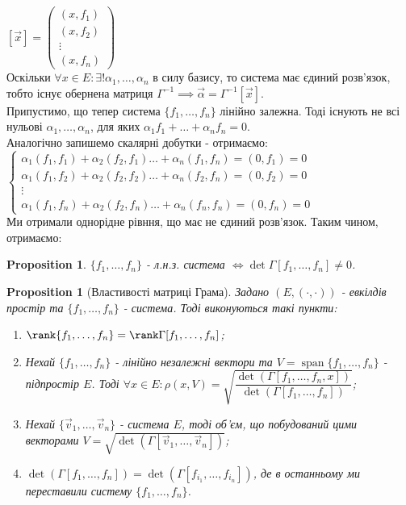 \documentclass[a4paper, 10pt]{article}
\theoremstyle{theoremdd}
\newtheorem{proposition}[theorem]{Proposition}
\DeclareMathOperator{\linspan}{span}
\begin{document}
$[\vec{x}] = \begin{pmatrix}
(x,f_1) \\ (x,f_2) \\ \vdots \\ (x,f_n)
\end{pmatrix}$\\
Оскільки $\forall x \in E: \exists! \alpha_1,\dots,\alpha_n$ в силу базису, то система має єдиний розв'язок, тобто існує обернена матриця $\Gamma^{-1} \implies \vec{\alpha} = \Gamma^{-1} [\vec{x}]$.
\bigskip \\
Припустимо, що тепер система $\{f_1,\dots,f_n\}$ лінійно залежна. Тоді існують не всі нульові $\alpha_1,\dots,\alpha_n$, для яких $\alpha_1 f_1 + \dots + \alpha_n f_n = 0$.\\
Аналогічно запишемо скалярні добутки - отримаємо:\\
$\begin{cases}
\alpha_1 (f_1,f_1) + \alpha_2 (f_2,f_1) \dots + \alpha_n (f_1,f_n) = (0,f_1) = 0 \\
\alpha_1 (f_1,f_2) + \alpha_2 (f_2,f_2) \dots + \alpha_n (f_2,f_n) = (0,f_2) = 0 \\
\vdots \\
\alpha_1 (f_1,f_n) + \alpha_2 (f_2,f_n) \dots + \alpha_n (f_n,f_n) = (0,f_n) = 0
\end{cases}$\\
Ми отримали однорідне рівння, що має не єдиний розв'язок. Таким чином, отримаємо:
\begin{proposition}
$\{f_1,\dots,f_n\}$ - л.н.з. система $\iff \det \Gamma[f_1,\dots,f_n] \neq 0$.
\end{proposition}

\begin{proposition}[Властивості матриці Грама]
Задано $(E,(\cdot,\cdot))$ - евкілдів простір та $\{f_1,\dots,f_n\}$ - система. Тоді виконуються такі пункти:
\begin{enumerate}[nosep, wide=0pt, label={\arabic*)}]
\item $\rank \{f_1,\dots,f_n\} = \rank \Gamma [f_1,\dots,f_n]$;
\item Нехай $\{f_1,\dots,f_n\}$ - лінійно незалежні вектори та $V = \linspan\{f_1,\dots,f_n\}$ - підпростір $E$. Тоді $\forall x \in E: \rho(x,V) = \sqrt{\dfrac{\det(\Gamma[f_1,\dots,f_n,x])}{\det(\Gamma[f_1,\dots,f_n])}}$;
\item Нехай $\{\vec{v}_1,\dots,\vec{v}_n\}$ - система $E$, тоді об'єм, що побудований цими векторами $V = \sqrt{\det(\Gamma[\vec{v}_1,\dots,\vec{v}_n])}$;
\item $\det(\Gamma[f_1,\dots,f_n]) = \det(\Gamma[f_{i_1},\dots,f_{i_n}])$, де в останньому ми переставили систему $\{f_1,\dots,f_n\}$.
\end{enumerate}
\end{proposition}
\end{document}
